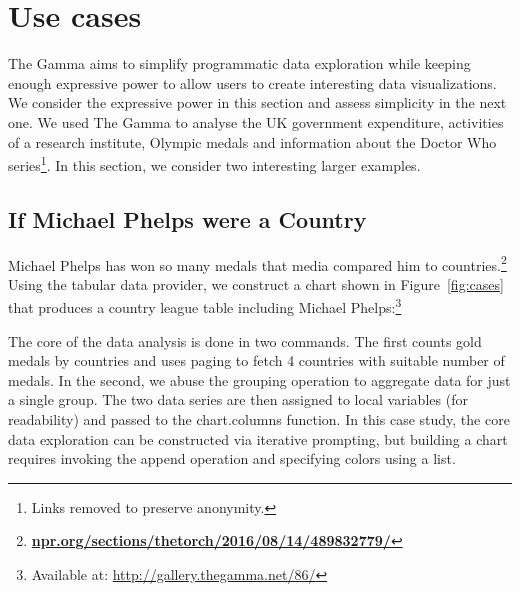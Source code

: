 \documentclass[manuscript,review,anonymous]{acmart}
\newcommand{\kvd}[1]{\textbf{#1}}
\newcommand{\ikvd}[1]{{\fontfamily{zi4}\selectfont\small #1}}
\begin{document}

\section{Use cases}
\label{sec:cases}

The Gamma aims to simplify programmatic data exploration while keeping enough expressive power
to allow users to create interesting data visualizations. We consider the expressive power in
this section and assess simplicity in the next one. We used The Gamma to analyse
the UK government expenditure, activities of a research institute, Olympic medals and
information about the Doctor Who series\footnote{Links removed to preserve anonymity.}.
In this section, we consider two interesting larger examples.

\subsection{If Michael Phelps were a Country}
Michael Phelps has won so many medals that media compared him to
countries.\footnote{\href{https://www.npr.org/sections/thetorch/2016/08/14/489832779/}{\small\bf\ttfamily npr.org/sections/thetorch/2016/08/14/489832779/}}
Using the tabular data provider, we construct a chart shown in Figure~\ref{fig:cases} that
produces a country league table including Michael Phelps:\footnote{Available at: \url{http://gallery.thegamma.net/86/}}


The core of the data analysis is done in two commands. The first counts gold medals by countries
and uses paging to fetch 4 countries with suitable number of medals. In the second, we abuse the
grouping operation to aggregate data for just a single group. The two data series are then assigned
to local variables (for readability) and passed to the \ikvd{chart.columns} function.
In this case study, the core data exploration can be constructed via iterative prompting, but
building a chart requires invoking the \ikvd{append} operation and specifying colors using a list.
\end{document}
